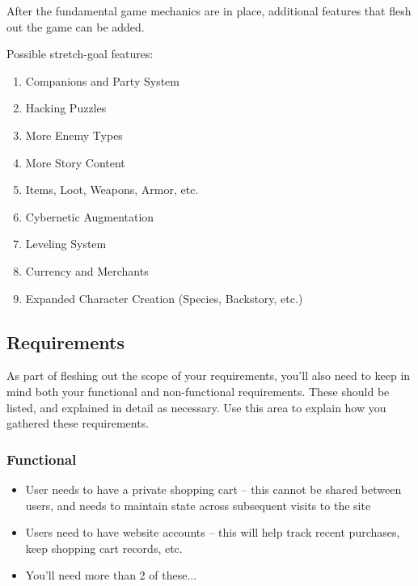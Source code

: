\documentclass[10pt,conference,onecolumn,compsoc]{IEEEtran}
\begin{document}
After the fundamental game mechanics are in place, additional features that flesh out the game can be added.

Possible stretch-goal features:
\begin{enumerate}
\item Companions and Party System
\item Hacking Puzzles
\item More Enemy Types
\item More Story Content
\item Items, Loot, Weapons, Armor, etc.
\item Cybernetic Augmentation
\item Leveling System
\item Currency and Merchants
\item Expanded Character Creation (Species, Backstory, etc.)
\end{enumerate}




\pagebreak
\subsection{Requirements}
As part of fleshing out the scope of your requirements, you'll also need to keep in mind both your functional and non-functional requirements.  These should be listed, and explained in detail as necessary.  Use this area to explain how you gathered these requirements.

\subsubsection{Functional}
\begin{itemize}
\item User needs to have a private shopping cart -- this cannot be shared between users, and needs to maintain state across subsequent visits to the site
\item Users need to have website accounts -- this will help track recent purchases, keep shopping cart records, etc.
\item You'll need more than 2 of these...
\end{itemize}
\end{document}
